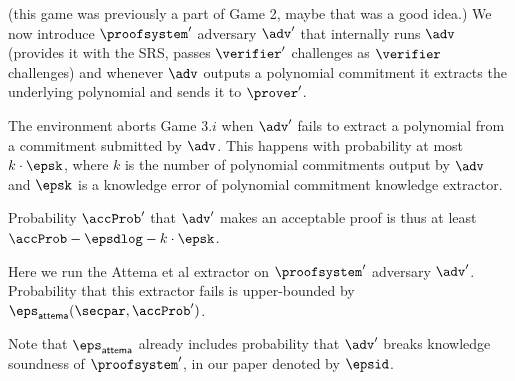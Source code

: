  {(this game was previously a part of Game 2, maybe that was a good idea.)}
  We now introduce $\proofsystem'$ adversary $\adv'$ that internally runs $\adv$ (provides
  it with the SRS, passes $\verifier'$ challenges as $\verifier$ challenges) and whenever
  $\adv$ outputs a polynomial commitment it extracts the underlying polynomial and sends
  it to $\prover'$.

The environment aborts Game $3.i$ when $\adv'$ fails to extract a polynomial from
a commitment submitted by $\adv$. This happens with probability at most $k \cdot \epsk$,
where $k$ is the number of polynomial commitments output by $\adv$ and $\epsk$ is a
knowledge error of polynomial commitment knowledge extractor.

Probability $\accProb'$ that $\adv'$ makes an acceptable proof is thus at least
$\accProb - \epsdlog - k \cdot \epsk$.

 { Here we run the Attema et al extractor on $\proofsystem'$ adversary
  $\adv'$. Probability that this extractor fails is upper-bounded by
  $\epsa (\secpar, \accProb')$.

  Note that $\epsa$ already includes probability that $\adv'$ breaks knowledge soundness
  of $\proofsystem'$, in our paper denoted by $\epsid$.  }



